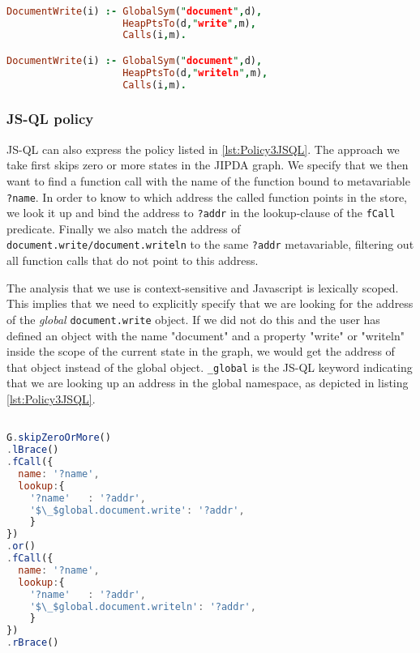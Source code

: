 \begin{lstlisting}[label={lst:Policy3GK},language=Prolog,caption=Policy 3 in GateKeeper,mathescape=true]  % float=t?

DocumentWrite(i) :- GlobalSym("document",d),
                    HeapPtsTo(d,"write",m),
                    Calls(i,m).

DocumentWrite(i) :- GlobalSym("document",d),
                    HeapPtsTo(d,"writeln",m),
                    Calls(i,m).
\end{lstlisting}


\subsubsection*{JS-QL policy}

JS-QL can also express the policy listed in \ref{lst:Policy3JSQL}. The approach we take first skips zero or more states in the JIPDA graph. We specify that we then want to find a function call with the name of the function bound to metavariable \texttt{?name}. In order to know to which address the called function points in the store, we look it up and bind the address to \texttt{?addr} in the lookup-clause of the \texttt{fCall} predicate. Finally we also match the address of \texttt{document.write/document.writeln} to the same \texttt{?addr} metavariable, filtering out all function calls that do not point to this address.

The analysis that we use is context-sensitive and Javascript is lexically scoped. This implies that we need to explicitly specify that we are looking for the address of the \textit{global} \texttt{document.write} object. If we did not do this and the user has defined an object with the name "document" and a property "write" or "writeln" inside the scope of the current state in the graph, we would get the address of that object instead of the global object. \texttt{\_global} is the JS-QL keyword indicating that we are looking up an address in the global namespace, as depicted in listing \ref{lst:Policy3JSQL}.

\begin{lstlisting}[label={lst:Policy3JSQL},language=JavaScript,caption=Policy 3 in JS-QL,mathescape=true]  % float=t?

G.skipZeroOrMore()
.lBrace()
.fCall({
  name: '?name',
  lookup:{
    '?name'   : '?addr',
    '$\_$global.document.write': '?addr',
    }
})
.or()
.fCall({
  name: '?name',
  lookup:{
    '?name'   : '?addr',
    '$\_$global.document.writeln': '?addr',
    }
})
.rBrace()
\end{lstlisting}

